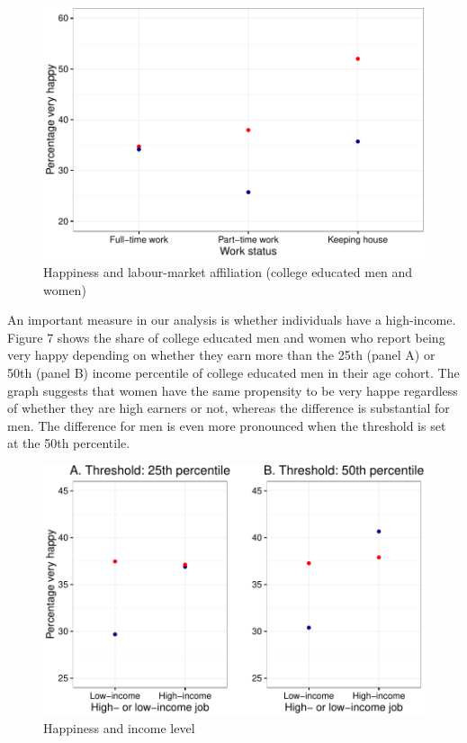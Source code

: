 \documentclass[]{article}
\begin{document}
\begin{figure}[htbp]
\centering
\includegraphics{Final_Project_P-P_analysis_Unger_files/figure-latex/unnamed-chunk-8-1.pdf}
\caption{Happiness and labour-market affiliation (college educated men
and women)}
\end{figure}

An important measure in our analysis is whether individuals have a
high-income. Figure 7 shows the share of college educated men and women
who report being very happy depending on whether they earn more than the
25th (panel A) or 50th (panel B) income percentile of college educated
men in their age cohort. The graph suggests that women have the same
propensity to be very happe regardless of whether they are high earners
or not, whereas the difference is substantial for men. The difference
for men is even more pronounced when the threshold is set at the 50th
percentile.

\begin{figure}[htbp]
\centering
\includegraphics{Final_Project_P-P_analysis_Unger_files/figure-latex/unnamed-chunk-9-1.pdf}
\caption{Happiness and income level}
\end{figure}
\end{document}
